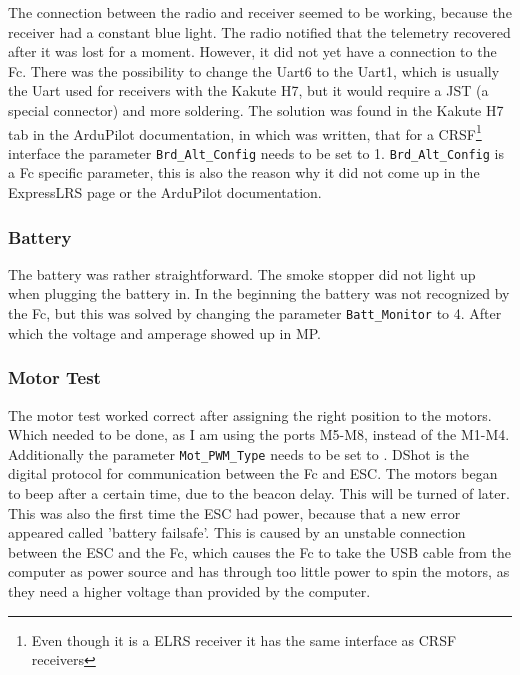 \documentclass[svgnames]{article}
\begin{document}
	The connection between the radio and receiver seemed to be working, because the receiver had a constant blue light. The radio notified that the telemetry recovered after it was lost for a moment. However, it did not yet have a connection to the Fc. There was the possibility to change the Uart6 to the Uart1, which is usually the Uart used for receivers with the Kakute H7, but it would require a JST (a special connector) and more soldering. The solution was found in the Kakute H7 tab in the ArduPilot documentation, in which was written, that for a CRSF\footnote{Even though it is a ELRS receiver it has the same interface as CRSF receivers} interface the parameter \lstinline|Brd_Alt_Config| needs to be set to 1. \lstinline|Brd_Alt_Config| is a Fc specific parameter, this is also the reason why it did not come up in the ExpressLRS page or the ArduPilot documentation. 

	\subsubsection{Battery}
	The battery was rather straightforward. The smoke stopper did not light up when plugging the battery in. In the beginning the battery was not recognized by the \gls{Fc}, but this was solved by changing the parameter \lstinline|Batt_Monitor| to 4. After which the voltage and amperage showed up in \gls{MP}.

	\subsubsection{Motor Test}
	The motor test worked correct after assigning the right position to the motors. Which needed to be done, as I am using the ports M5-M8, instead of the M1-M4. Additionally the parameter \lstinline|Mot_PWM_Type| needs to be set to . \Gls{DShot} is the digital protocol for communication between the \gls{Fc} and \gls{ESC}. The motors began to beep after a certain time, due to the beacon delay. This will be turned of later. This was also the first time the \gls{ESC} had power, because that a new error appeared called 'battery failsafe'. This is caused by an unstable connection between the \gls{ESC} and the \gls{Fc}, which causes the \gls{Fc} to take the USB cable from the computer as power source and has through too little power to spin the motors, as they need a higher voltage than provided by the computer.
	
\end{document}
